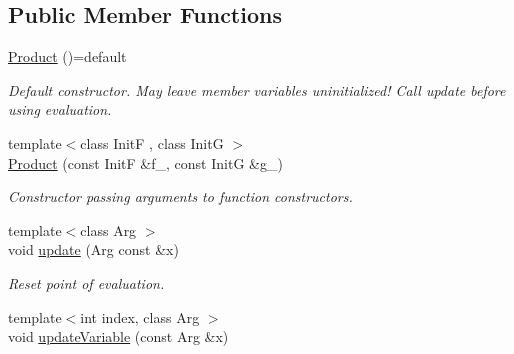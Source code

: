 \subsection*{Public Member Functions}
\begin{DoxyCompactItemize}
\item 
\hypertarget{structRFFGen_1_1MathematicalOperations_1_1Product_a8f90fefe7c771b6dcb3b714c85be41fa}{\hyperlink{structRFFGen_1_1MathematicalOperations_1_1Product_a8f90fefe7c771b6dcb3b714c85be41fa}{Product} ()=default}\label{structRFFGen_1_1MathematicalOperations_1_1Product_a8f90fefe7c771b6dcb3b714c85be41fa}

\begin{DoxyCompactList}\small\item\em Default constructor. May leave member variables uninitialized! Call update before using evaluation. \end{DoxyCompactList}\item 
{\footnotesize template$<$class Init\-F , class Init\-G $>$ }\\\hyperlink{structRFFGen_1_1MathematicalOperations_1_1Product_aaa4efed57c0ed72f39d363c88fa04da0}{Product} (const Init\-F \&f\-\_\-, const Init\-G \&g\-\_\-)
\begin{DoxyCompactList}\small\item\em Constructor passing arguments to function constructors. \end{DoxyCompactList}\item 
\hypertarget{structRFFGen_1_1MathematicalOperations_1_1Product_a4cfbb3c643899bb7e3468587d9800a26}{{\footnotesize template$<$class Arg $>$ }\\void \hyperlink{structRFFGen_1_1MathematicalOperations_1_1Product_a4cfbb3c643899bb7e3468587d9800a26}{update} (Arg const \&x)}\label{structRFFGen_1_1MathematicalOperations_1_1Product_a4cfbb3c643899bb7e3468587d9800a26}

\begin{DoxyCompactList}\small\item\em Reset point of evaluation. \end{DoxyCompactList}\item 
\hypertarget{structRFFGen_1_1MathematicalOperations_1_1Product_ade58e75205d33ba03780b934e4b379c3}{{\footnotesize template$<$int index, class Arg $>$ }\\void \hyperlink{structRFFGen_1_1MathematicalOperations_1_1Product_ade58e75205d33ba03780b934e4b379c3}{update\-Variable} (const Arg \&x)}\label{structRFFGen_1_1MathematicalOperations_1_1Product_ade58e75205d33ba03780b934e4b379c3}


\end{DoxyCompactItemize}
